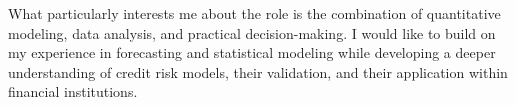 What particularly interests me about the \position{} role is the combination of {quantitative modeling, data analysis, and practical decision-making}. I would like to build on my experience in forecasting and statistical modeling while developing a deeper understanding of {credit risk models, their validation, and their application within financial institutions}.